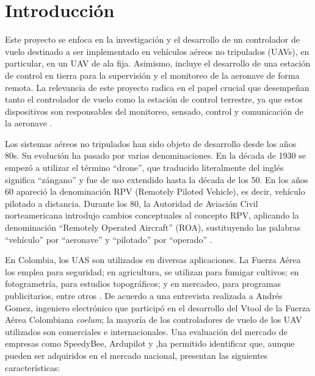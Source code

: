 \section{Introducción }
\vspace{5 px}


Este proyecto se enfoca en la investigación y el desarrollo de un controlador de vuelo destinado a ser implementado en vehículos aéreos no tripulados (UAVs), en particular, en un UAV de ala fija. Asimismo, incluye el desarrollo de una estación de control en tierra para la supervisión y el monitoreo de la aeronave de forma remota. La relevancia de este proyecto radica en el papel crucial que desempeñan tanto el controlador de vuelo como la estación de control terrestre, ya que estos dispositivos son responsables del monitoreo, sensado, control y comunicación de la aeronave \cite{justin}. \vspace{5px}


Los sistemas aéreos no tripulados han sido objeto de desarrollo desde los años 80s. Su evolución ha pasado por varias denominaciones. En la década de 1930 se empezó a utilizar el término “drone”, que traducido literalmente del inglés significa “zángano” y fue de uso extendido hasta la década de los 50. En los años 60 apareció la denominación RPV (Remotely Piloted Vehicle), es decir, vehículo pilotado a distancia. Durante los 80, la Autoridad de Aviación Civil norteamericana introdujo cambios conceptuales al concepto RPV, aplicando la denominación “Remotely Operated Aircraft” (ROA), sustituyendo las palabras “vehículo” por “aeronave” y “pilotado” por “operado” \cite{UAS-FAC}.\vspace{5px}

En Colombia, los UAS son utilizados en diversas aplicaciones. La Fuerza Aérea los emplea para seguridad; en agricultura, se utilizan para fumigar cultivos; en fotogrametría, para estudios topográficos; y en mercadeo, para programas publicitarios, entre otros \cite{UAgriculture}. De acuerdo a una entrevista realizada a Andrés Gomez, ingeniero electrónico que participó en el desarrollo del Vtool de la Fuerza Aérea Colombiana \textit{coelum}; la mayoría de los controladores de vuelo de los UAV utilizados son comerciales e internacionales. Una evaluación del mercado de empresas como SpeedyBee, Ardupilot y  ,ha permitido identificar que, aunque pueden ser adquiridos en el mercado nacional, presentan las siguientes características:\\

